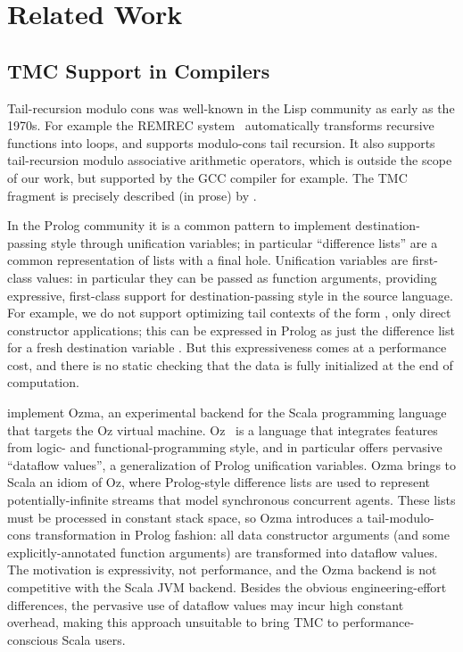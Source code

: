 \section{Related Work}

\subsection{TMC Support in Compilers}

Tail-recursion modulo cons was well-known in the Lisp community as
early as the 1970s. For example the REMREC system~\citep*{risch-73}
automatically transforms recursive functions into loops, and
supports modulo-cons tail recursion. It also supports tail-recursion
modulo associative arithmetic operators, which is outside the scope
of our work, but supported by the GCC compiler for example. The TMC
fragment is precisely described (in prose) by \citet*{friedman-wise-75}.

In the Prolog community it is a common pattern to implement destination-passing style through unification variables; in particular ``difference lists'' are a common representation of lists with a final hole.
Unification variables are first-class values: in particular they can be passed as function arguments, providing expressive, first-class support for destination-passing style in the source language.
For example, we do not support optimizing tail contexts of the form , only direct constructor applications; this can be expressed in Prolog as just the difference list  for a fresh destination variable .
But this expressiveness comes at a performance cost, and there is no static checking that the data is fully initialized at the end of computation.

\citet*{tmc-scala-2013} implement Ozma, an experimental backend for
the Scala programming language that targets the Oz virtual machine.
Oz~\citep*{oz-1994,oz-1995} is a language that integrates features
from logic- and functional-programming style, and in particular offers
pervasive ``dataflow values'', a generalization of Prolog unification
variables. Ozma brings to Scala an idiom of Oz, where Prolog-style
difference lists are used to represent potentially-infinite streams
that model synchronous concurrent agents. These lists must be
processed in constant stack space, so Ozma introduces
a tail-modulo-cons transformation in Prolog fashion: all data
constructor arguments (and some explicitly-annotated
function arguments) are transformed into dataflow values. The
motivation is expressivity, not performance, and the Ozma backend is
not competitive with the Scala JVM backend. Besides the obvious
engineering-effort differences, the pervasive use of dataflow values
may incur high constant overhead, making this approach unsuitable to
bring TMC to performance-conscious Scala users.

